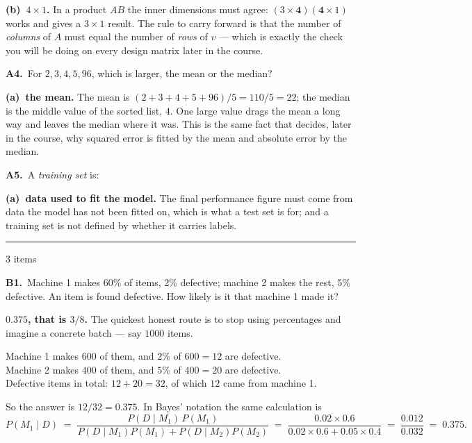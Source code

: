 \documentclass[10pt,a4paper]{article}
\newcommand{\parthead}[2]{\vspace{2pt}\noindent\rule{\linewidth}{0.4pt}\par\vspace{2pt}%
  \noindent{\bfseries Block #1}\hfill{\small #2}\par\vspace{1pt}}
\newcommand{\sol}[1]{\textbf{#1}}
\begin{document}
\sol{(b)\ $4 \times 1$.} In a product $A B$ the inner dimensions must agree: $(3 \times \mathbf{4})
(\mathbf{4} \times 1)$ works and gives a $3 \times 1$ result. The rule to carry forward is that the
number of \emph{columns} of $A$ must equal the number of \emph{rows} of $v$ --- which is exactly the
check you will be doing on every design matrix later in the course.

\vspace{5pt}

\textbf{A4.}\ For $2, 3, 4, 5, 96$, which is larger, the mean or the median?

\sol{(a)\ the mean.} The mean is $(2+3+4+5+96)/5 = 110/5 = 22$; the median is the middle value of the
sorted list, $4$. One large value drags the mean a long way and leaves the median where it was. This is
the same fact that decides, later in the course, why squared error is fitted by the mean and absolute
error by the median.

\vspace{5pt}

\textbf{A5.}\ A \emph{training set} is:

\sol{(a)\ data used to fit the model.} The final performance figure must come from data the model has
not been fitted on, which is what a test set is for; and a training set is not defined by whether it
carries labels.

\parthead{B --- Working}{3 items}

\textbf{B1.}\ Machine 1 makes 60\% of items, 2\% defective; machine 2 makes the rest, 5\% defective. An
item is found defective. How likely is it that machine 1 made it?

\vspace{2pt}

\sol{$0.375$, that is $3/8$.} The quickest honest route is to stop using percentages and imagine a
concrete batch --- say $1000$ items.

\vspace{2pt}
\hspace*{6mm}Machine 1 makes $600$ of them, and $2\%$ of $600 = 12$ are defective.\\
\hspace*{6mm}Machine 2 makes $400$ of them, and $5\%$ of $400 = 20$ are defective.\\
\hspace*{6mm}Defective items in total: $12 + 20 = 32$, of which $12$ came from machine 1.
\vspace{2pt}

So the answer is $12/32 = 0.375$. In Bayes' notation the same calculation is
\[
P(M_1 \mid D) \;=\; \frac{P(D \mid M_1)\,P(M_1)}{P(D \mid M_1)P(M_1) + P(D \mid M_2)P(M_2)}
\;=\; \frac{0.02 \times 0.6}{0.02 \times 0.6 + 0.05 \times 0.4}
\;=\; \frac{0.012}{0.032} \;=\; 0.375 .
\]
\end{document}
